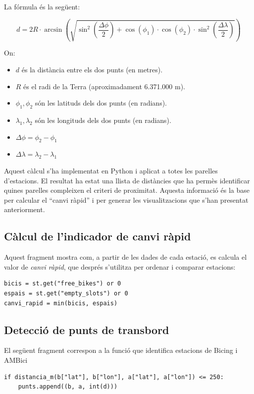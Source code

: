 La fórmula és la següent:

$$
d = 2R \cdot \arcsin\left( \sqrt{ \sin^2\left( \frac{\Delta\phi}{2} \right) + \cos(\phi_1) \cdot \cos(\phi_2) \cdot \sin^2\left( \frac{\Delta\lambda}{2} \right) } \right)
$$



On:
\begin{itemize}
  \item \( d \) és la distància entre els dos punts (en metres).
  \item \( R \) és el radi de la Terra (aproximadament 6.371.000 m).
  \item \( \phi_1, \phi_2 \) són les latituds dels dos punts (en radians).
  \item \( \lambda_1, \lambda_2 \) són les longituds dels dos punts (en radians).
  \item \( \Delta\phi = \phi_2 - \phi_1 \)
  \item \( \Delta\lambda = \lambda_2 - \lambda_1 \)
\end{itemize}

Aquest càlcul s’ha implementat en Python i aplicat a totes les parelles d’estacions. El resultat ha estat una llista de distàncies que ha permès identificar quines parelles compleixen el criteri de proximitat. Aquesta informació és la base per calcular el “canvi ràpid” i per generar les visualitzacions que s’han presentat anteriorment.

\subsection{Càlcul de l’indicador de canvi ràpid}
Aquest fragment mostra com, a partir de les dades de cada estació, es calcula el valor
de \emph{canvi ràpid}, que després s’utilitza per ordenar i comparar estacions:

\begin{verbatim}
bicis = st.get("free_bikes") or 0
espais = st.get("empty_slots") or 0
canvi_rapid = min(bicis, espais)
\end{verbatim}

\subsection{Detecció de punts de transbord}
El següent fragment correspon a la funció que identifica estacions de Bicing i AMBici

\begin{verbatim}
if distancia_m(b["lat"], b["lon"], a["lat"], a["lon"]) <= 250:
    punts.append((b, a, int(d)))
\end{verbatim}

